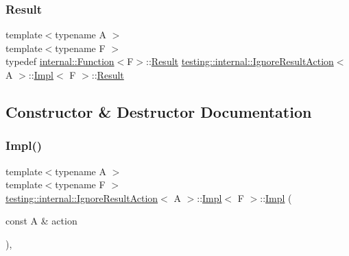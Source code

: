 \mbox{\label{classtesting_1_1internal_1_1_ignore_result_action_1_1_impl_a5848be04a86b1149840d04eca6e0bc80}} 
\subsubsection{\texorpdfstring{Result}{Result}\hspace{0.1cm}{\footnotesize\ttfamily [3/3]}}
{\footnotesize\ttfamily template$<$typename A $>$ \\
template$<$typename F $>$ \\
typedef \mbox{\hyperlink{structtesting_1_1internal_1_1_function}{internal\+::\+Function}}$<$F$>$\+::\mbox{\hyperlink{classtesting_1_1_action_interface_a7477de2fe3e4e01c59db698203acaee7}{Result}} \mbox{\hyperlink{classtesting_1_1internal_1_1_ignore_result_action}{testing\+::internal\+::\+Ignore\+Result\+Action}}$<$ A $>$\+::\mbox{\hyperlink{classtesting_1_1internal_1_1_ignore_result_action_1_1_impl}{Impl}}$<$ F $>$\+::\mbox{\hyperlink{classtesting_1_1_action_interface_a7477de2fe3e4e01c59db698203acaee7}{Result}}}



\subsection{Constructor \& Destructor Documentation}
\mbox{\label{classtesting_1_1internal_1_1_ignore_result_action_1_1_impl_a0252ee58746d81d31b92526b2336892e}} 
\subsubsection{\texorpdfstring{Impl()}{Impl()}\hspace{0.1cm}{\footnotesize\ttfamily [1/3]}}
{\footnotesize\ttfamily template$<$typename A $>$ \\
template$<$typename F $>$ \\
\mbox{\hyperlink{classtesting_1_1internal_1_1_ignore_result_action}{testing\+::internal\+::\+Ignore\+Result\+Action}}$<$ A $>$\+::\mbox{\hyperlink{classtesting_1_1internal_1_1_ignore_result_action_1_1_impl}{Impl}}$<$ F $>$\+::\mbox{\hyperlink{classtesting_1_1internal_1_1_ignore_result_action_1_1_impl}{Impl}} (\begin{DoxyParamCaption}\item[{const A \&}]{action }\end{DoxyParamCaption})\hspace{0.3cm}{\ttfamily [inline]}, {\ttfamily [explicit]}}

